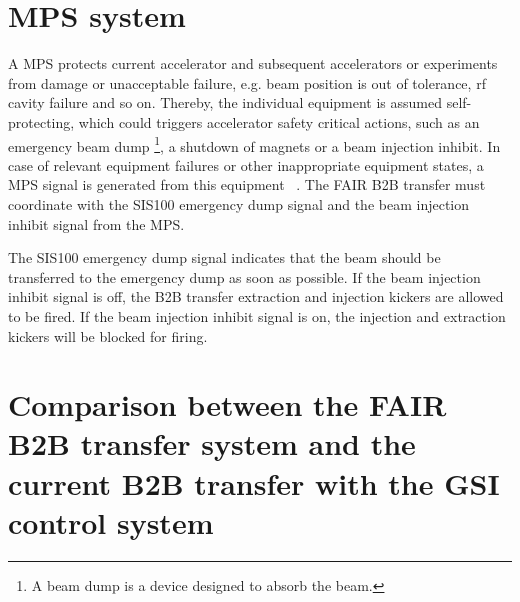 \section{\gls{MPS} system}
A MPS protects current accelerator and subsequent accelerators or experiments from damage or unacceptable failure, e.g. beam position is out of tolerance, rf cavity failure and so on. Thereby, the individual equipment is assumed self-protecting, which could triggers accelerator safety critical actions, such as an emergency beam dump \footnote{A beam dump is a device designed to absorb the beam.}, a shutdown of magnets or a beam injection inhibit. In case of relevant equipment failures or other inappropriate equipment states, a MPS signal is generated from this equipment ~\cite{mandakovic_fair_????}. The FAIR B2B transfer must coordinate with the SIS100 emergency dump signal and the beam injection inhibit signal from the MPS. 

The SIS100 emergency dump signal indicates that the beam should be transferred to the emergency dump as soon as possible. If the beam injection inhibit signal is off, the B2B transfer extraction and injection kickers are allowed to be fired. If the beam injection inhibit signal is on, the injection and extraction kickers will be blocked for firing. 


\section{Comparison between the FAIR B2B transfer system and the current B2B transfer with the GSI control system}



